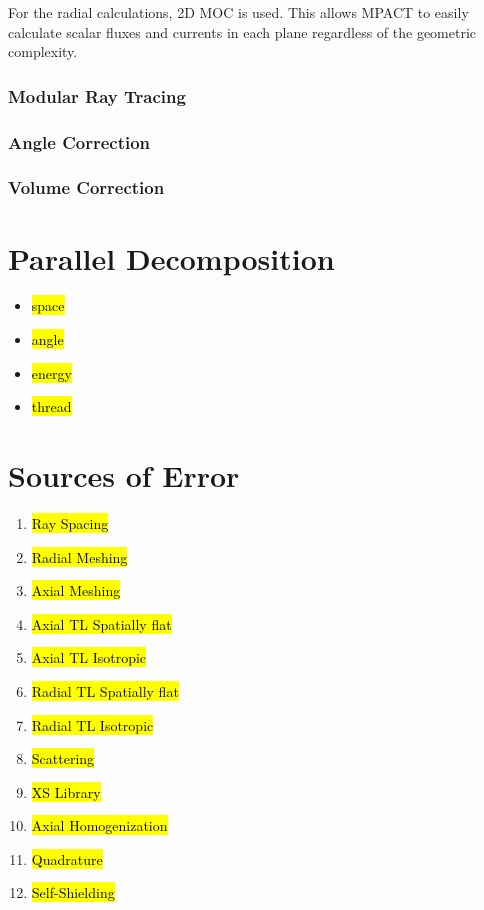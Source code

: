 For the radial calculations, 2D MOC is used.  This allows MPACT to easily calculate scalar fluxes and currents in each plane regardless of the geometric complexity.

\subsubsection{Modular Ray Tracing}



\subsubsection{Angle Correction}



\subsubsection{Volume Correction}



\section{Parallel Decomposition}

\begin{itemize}
\item \hl{space}
\item \hl{angle}
\item \hl{energy}
\item \hl{thread}
\end{itemize}

\section{Sources of Error}

\begin{enumerate}
\item \hl{Ray Spacing}
\item \hl{Radial Meshing}
\item \hl{Axial Meshing}
\item \hl{Axial TL Spatially flat}
\item \hl{Axial TL Isotropic}
\item \hl{Radial TL Spatially flat}
\item \hl{Radial TL Isotropic}
\item \hl{Scattering}
\item \hl{XS Library}
\item \hl{Axial Homogenization}
\item \hl{Quadrature}
\item \hl{Self-Shielding}
\end{enumerate}

